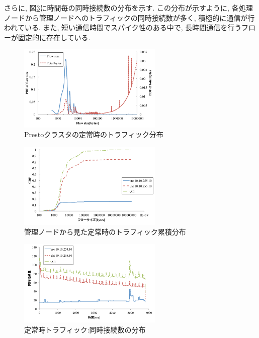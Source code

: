 \documentclass[11pt, a4paper, twocolumn]{jsarticle}
\begin{document}
さらに, 図\ref{fig:constant_conc}に時間毎の同時接続数の分布を示す.
この分布が示すように, 各処理ノードから管理ノードへのトラフィックの同時接続数が多く, 積極的に通信が行われている.
また, 短い通信時間でスパイク性のある中で, 長時間通信を行うフローが固定的に存在している.

\begin{figure}[t]
    \begin{center}
    \includegraphics[autoebb, width=195pt]{./img/constant.pdf}
    \caption{Prestoクラスタの定常時のトラフィック分布}
    \label{fig:constant}
    \end{center}
\end{figure}

\begin{figure}[t]
    \begin{center}
    \includegraphics[autoebb, width=195pt]{./img/constant_cdf.pdf}
    \caption{管理ノードから見た定常時のトラフィック累積分布}
    \label{fig:constant_cdf}
    \end{center}
\end{figure}

\begin{figure}[t]
    \begin{center}
    \includegraphics[autoebb, width=195pt]{./img/constant_conc.pdf}
    \caption{定常時トラフィック:同時接続数の分布}
    \label{fig:constant_conc}
    \end{center}
\end{figure}
\end{document}
